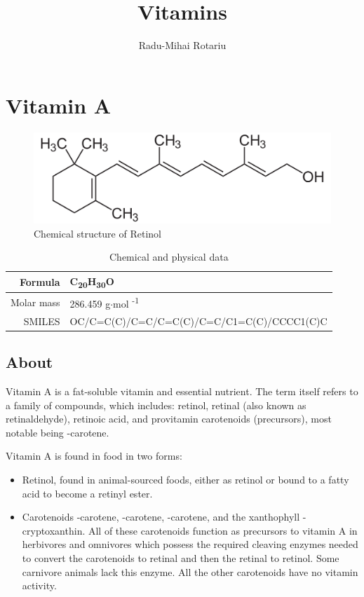 \documentclass{book}
\begin{document}
\title{Vitamins}
\author{Radu-Mihai Rotariu}
\maketitle
{}
\tableofcontents\newpage
{}

\chapter{Vitamin A}
\begin{figure}[h]
	\caption{Chemical structure of Retinol}
	\centering \includegraphics[width=\textwidth]{images/Vitamin_A_chemical_structure}
\end{figure}

\begin{table}[h]
	\caption{Chemical and physical data}
	\centering \begin{tabular}{| r | l |}
		\hline
		Formula & C\textsubscript{20}H\textsubscript{30}O\\ \hline
		Molar mass & 286.459 g$\cdot$mol \textsuperscript{-1}\\ \hline
		SMILES & OC/C=C(C)/C=C/C=C(C)/C=C/C1=C(C)/CCCC1(C)C\\ \hline
	\end{tabular}
\end{table}
\newpage

\section{About}
Vitamin A is a fat-soluble vitamin and essential nutrient. The term itself refers to a family of compounds, which includes: retinol, retinal (also known as retinaldehyde), retinoic acid, and provitamin carotenoids (precursors), most notable being \textbeta-carotene.

Vitamin A is found in food in two forms:
\begin{itemize}
	\item Retinol, found in animal-sourced foods, either as retinol or bound to a fatty acid to become a retinyl ester.
	\item Carotenoids \textalpha-carotene, \textbeta-carotene, \textgamma-carotene, and the xanthophyll \textbeta-cryptoxanthin. All of these carotenoids function as precursors to vitamin A in herbivores and omnivores which possess the required cleaving enzymes needed to convert the carotenoids to retinal and then the retinal to retinol. Some carnivore animals lack this enzyme. All the other carotenoids have no vitamin activity.
\end{itemize}
\end{document}
